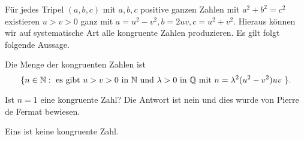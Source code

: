 Für jedes Tripel $(a,b,c)$ mit $a,b,c$ positive ganzen Zahlen mit
$a^2+b^2=c^2$ existieren $u>v>0$ ganz mit $a =
u^2-v^2,b=2uv,c=u^2+v^2$. Hieraus können wir auf systematische Art
alle kongruente Zahlen produzieren. Es gilt folgt folgende Aussage.

\begin{lemma}
  Die Menge der kongruenten Zahlen ist
  $$
  \{ n \in {\mathbb{N}} : \text{ es gibt $u>v>0$ in ${\mathbb{N}}$ und $\lambda>0$ in ${\mathbb{Q}}$ mit
    $n=\lambda^2 (u^2-v^2)uv$ }
  \}.
  $$
\end{lemma}


Ist $n=1$ eine kongruente Zahl? Die Antwort ist nein und dies wurde
von Pierre de Fermat bewiesen.

\begin{satz}[Fermat]
  \label{satz:fermat}
  Eins  ist keine kongruente Zahl.
\end{satz}
